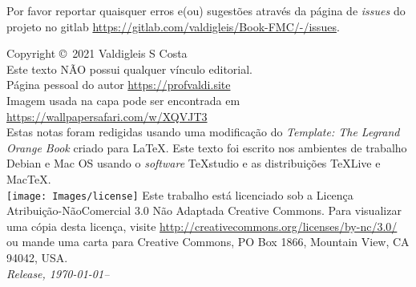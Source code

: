 \newpage
\noindent Por favor reportar quaisquer erros e(ou) sugestões através da página de \textit{issues} do projeto no gitlab \url{https://gitlab.com/valdigleis/Book-FMC/-/issues}.
~\vfill
\thispagestyle{empty}

\noindent Copyright \copyright\ 2021 Valdigleis S Costa\\ %

\noindent Este texto  \textsc{NÃO}  possui qualquer vínculo editorial.\\ %

\noindent Página pessoal do autor \url{https://profvaldi.site}\\ 

\noindent Imagem usada na capa pode ser encontrada em \url{https://wallpapersafari.com/w/XQVJT3}\\

\noindent Estas notas foram redigidas usando uma modificação do \textit{Template: 	
The Legrand Orange Book} criado para \LaTeX. Este texto foi escrito nos ambientes de trabalho Debian e Mac OS usando o \textit{software} TeXstudio e as distribuições TeXLive e MacTeX. \\ 

\noindent \texttt{[image: Images/license]}  Este trabalho está licenciado sob a Licença Atribuição-NãoComercial 3.0 Não Adaptada Creative Commons. Para visualizar uma cópia desta licença, visite \url{http://creativecommons.org/licenses/by-nc/3.0/} ou mande uma carta para Creative Commons, PO Box 1866, Mountain View, CA 94042, USA.\\


\noindent \textit{Release, \today--\currenttime} %